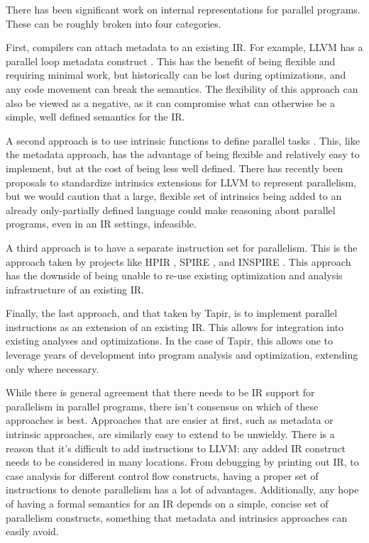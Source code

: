\documentclass[sigconf]{acmart}
\begin{document}
There has been significant work on internal representations for parallel
programs. These can be roughly broken into four categories. 

First, compilers can attach metadata to an existing IR. For example, LLVM has a
parallel loop metadata construct \cite{}. This has the benefit of being
flexible and requiring minimal work, but historically can be lost during
optimizations, and any code movement can break the semantics. The flexibility
of this approach can also be viewed as a negative, as it can compromise
what can otherwise be a simple, well defined semantics for the IR. 

A second approach is to use intrinsic functions to define parallel tasks
\cite{ares}. This, like the metadata approach, has the advantage of being
flexible and relatively easy to implement, but at the cost of being less well
defined. There has recently been proposals to standardize intrinsics extensions
for LLVM to represent parallelism, but we would caution that a large, flexible
set of intrinsics being added to an already only-partially defined
\cite{verillvm} language could make reasoning about parallel programs, even
in an IR settings, infeasible. 

A third approach is to have a separate instruction set for parallelism. This is
the approach taken by projects like HPIR \cite{zhao2011intermediate}, SPIRE
\cite{khaldi2012spire}, and INSPIRE \cite{jordan2013inspire}. This approach has
the downside of being unable to re-use existing optimization and analysis
infrastructure of an existing IR. 

Finally, the last approach, and that taken by Tapir, is to implement parallel 
instructions as an extension of an existing IR. This allows for integration
into existing analyses and optimizations. In the case of Tapir, this allows one
to leverage years of development into program analysis and optimization,
extending only where necessary. 

While there is general agreement that there needs to be IR support for
parallelism in parallel programs, there isn't consensus on which of these
approaches is best. Approaches that are easier at first, such as metadata
or intrinsic approaches, are similarly easy to extend to be unwieldy. There is
a reason that it's difficult to add instructions to LLVM: any added IR
construct needs to be considered in many locations. From debugging by printing
out IR, to case analysis for different control flow constructs, having 
a proper set of instructions to denote parallelism has a lot of advantages. 
Additionally, any hope of having a formal semantics for an IR depends on a 
simple, concise set of parallelism constructs, something that metadata and
intrinsics approaches can easily avoid. 
\end{document}
